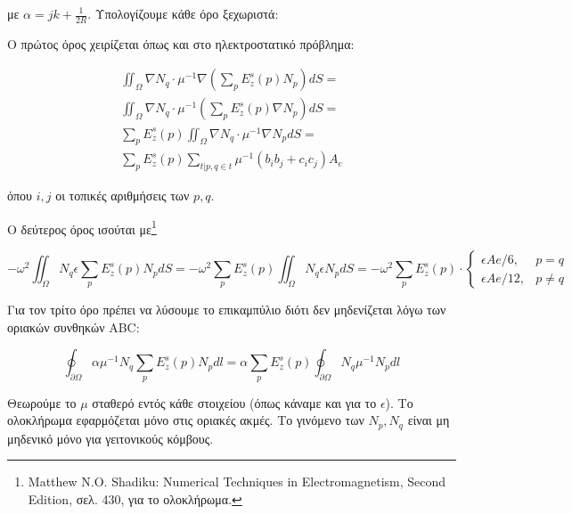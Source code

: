 \documentclass[10pt, letterpaper]{article}
\newcommand{\en}{\selectlanguage{english}}
\newcommand{\gr}{\selectlanguage{greek}}
\begin{document}
με $\alpha = jk + \frac{1}{2R}$.
Υπολογίζουμε κάθε όρο ξεχωριστά:

Ο πρώτος όρος χειρίζεται όπως και στο ηλεκτροστατικό πρόβλημα:

\begin{equation}
  \begin{aligned}
    \iint_{\Omega} \nabla N_q \cdot \mu^{-1}  \nabla \left( \sum_p E_z^s(p) N_p \right) dS  = \\
    \iint_{\Omega} \nabla N_q \cdot \mu^{-1}   \left( \sum_p E_z^s(p) \nabla N_p \right) dS  = \\
    \sum_p E_z^s(p) \iint_{\Omega} \nabla N_q \cdot \mu^{-1}   \nabla N_p dS  = \\ 
    \sum_p E_z^s(p) \sum_{t | p,q \in t} \mu^{-1} (b_ib_j + c_ic_j) A_e
  \end{aligned}
\end{equation}

όπου $i,j$ οι τοπικές αριθμήσεις των $p,q$. 

Ο δεύτερος όρος ισούται με\footnote{\textlatin{Matthew N.O. Shadiku: Numerical Techniques in Electromagnetism, Second Edition}, σελ.  430, για το ολοκλήρωμα.}

\begin{equation}
    - \omega^2 \iint_{\Omega} N_q \epsilon \sum_p E_z^s(p) N_p dS = 
    - \omega^2 \sum_p E_z^s(p) \iint_{\Omega} N_q \epsilon  N_p dS = 
    - \omega^2 \sum_p E_z^s(p) \cdot
    \begin{cases}
      \epsilon Ae / 6, & p = q \\ 
      \epsilon Ae / 12, & p \neq q
    \end{cases}
\end{equation}




Για τον τρίτο όρο πρέπει να λύσουμε το επικαμπύλιο διότι δεν μηδενίζεται λόγω των οριακών συνθηκών \en ABC: \gr 

\begin{equation}
    \oint_{\partial \Omega} \alpha \mu^{-1} N_q \sum_{p} E_z^s(p) N_p dl = \alpha \sum_p E_z^s(p) \oint_{\partial \Omega} N_q \mu^{-1} N_p dl
\end{equation}

Θεωρούμε το $\mu$ σταθερό εντός κάθε στοιχείου (όπως κάναμε και για το $\epsilon$).
Το ολοκλήρωμα εφαρμόζεται μόνο στις οριακές ακμές. Το γινόμενο των $N_p, N_q$ είναι μη μηδενικό μόνο για γειτονικούς κόμβους.
\end{document}
